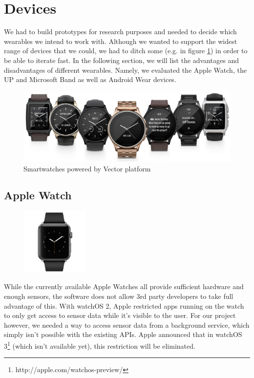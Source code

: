 \section{Devices}
\label{sec:devices}

We had to build prototypes for research purposes and needed to decide which wearables we intend to work with.
Although we wanted to support the widest range of devices that we could, we had to ditch some (e.g. in figure \ref{fig:devices}) in order to be able to iterate fast.
In the following section, we will list the advantages and disadvantages of different wearables.
Namely, we evaluated the Apple Watch, the UP and Microsoft Band as well as Android Wear devices.

\begin{figure}[H]
	\begin{center}
		\includegraphics[width=0.8\linewidth]{images/devices_vectorwatches.png}
		\caption[Caption for devices]{Smartwatches powered by Vector platform\footnotemark}
		\label{fig:devices}
	\end{center}
\end{figure}

\subsection{Apple Watch}
\begin{figure}
	\begin{center}
		\includegraphics[width=0.3\textwidth]{images/device_applewatch.png}
	\end{center}
\end{figure}
While the currently available Apple Watches all provide sufficient hardware and enough sensors, the software does not allow 3rd party developers to take full advantage of this.
With watchOS 2, Apple restricted apps running on the watch to only get access to sensor data while it's visible to the user.
For our project however, we needed a way to access sensor data from a background service, which simply isn't possible with the existing APIs.
Apple announced that in watchOS 3\footnote{http://apple.com/watchos-preview/} (which isn't available yet), this restriction will be eliminated. 

